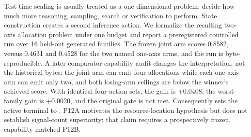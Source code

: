 \markdownRendererDocumentBegin
Test-time scaling is usually treated as a one-dimensional problem: decide how much more reasoning, sampling, search or verification to perform. State construction creates a second inference action. We formalize the resulting two-axis allocation problem under one budget and report a preregistered controlled run over 16 held-out generated families. The frozen joint arm scores 0.8582, versus 0.4631 and 0.4528 for the two named one-axis arms, and the run is byte-reproducible. A later comparator-capability audit changes the interpretation, not the historical bytes: the joint arm can emit four allocations while each one-axis arm can emit only two, and both losing-arm ceilings are below the winner's achieved score. With identical four-action sets, the gain is +0.0408, the worst-family gain is +0.0020, and the original gate is not met. Consequently  sets the active terminal to . P12A motivates the resource-location hypothesis but does not establish signal-count superiority; that claim requires a prospectively frozen, capability-matched P12B.\markdownRendererDocumentEnd